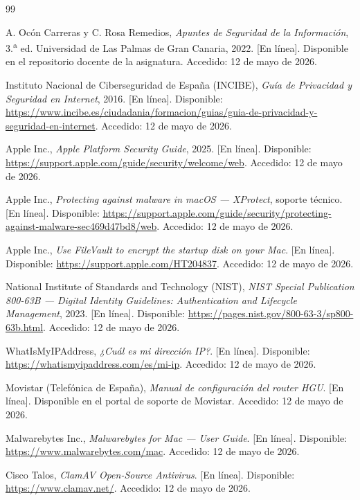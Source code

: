 \begin{thebibliography}{99}

A. Ocón Carreras y C. Rosa Remedios, \emph{Apuntes de Seguridad de la Información}, 3.\textsuperscript{a} ed. Universidad de Las Palmas de Gran Canaria, 2022. [En línea]. Disponible en el repositorio docente de la asignatura. Accedido: 12 de mayo de 2026.

Instituto Nacional de Ciberseguridad de España (INCIBE), \emph{Guía de Privacidad y Seguridad en Internet}, 2016. [En línea]. Disponible: \url{https://www.incibe.es/ciudadania/formacion/guias/guia-de-privacidad-y-seguridad-en-internet}. Accedido: 12 de mayo de 2026.

Apple Inc., \emph{Apple Platform Security Guide}, 2025. [En línea]. Disponible: \url{https://support.apple.com/guide/security/welcome/web}. Accedido: 12 de mayo de 2026.

Apple Inc., \emph{Protecting against malware in macOS --- XProtect}, soporte técnico. [En línea]. Disponible: \url{https://support.apple.com/guide/security/protecting-against-malware-sec469d47bd8/web}. Accedido: 12 de mayo de 2026.

Apple Inc., \emph{Use FileVault to encrypt the startup disk on your Mac}. [En línea]. Disponible: \url{https://support.apple.com/HT204837}. Accedido: 12 de mayo de 2026.

National Institute of Standards and Technology (NIST), \emph{NIST Special Publication 800-63B --- Digital Identity Guidelines: Authentication and Lifecycle Management}, 2023. [En línea]. Disponible: \url{https://pages.nist.gov/800-63-3/sp800-63b.html}. Accedido: 12 de mayo de 2026.

WhatIsMyIPAddress, \emph{¿Cuál es mi dirección IP?}. [En línea]. Disponible: \url{https://whatismyipaddress.com/es/mi-ip}. Accedido: 12 de mayo de 2026.

Movistar (Telefónica de España), \emph{Manual de configuración del router HGU}. [En línea]. Disponible en el portal de soporte de Movistar. Accedido: 12 de mayo de 2026.

Malwarebytes Inc., \emph{Malwarebytes for Mac --- User Guide}. [En línea]. Disponible: \url{https://www.malwarebytes.com/mac}. Accedido: 12 de mayo de 2026.

Cisco Talos, \emph{ClamAV Open-Source Antivirus}. [En línea]. Disponible: \url{https://www.clamav.net/}. Accedido: 12 de mayo de 2026.

\end{thebibliography}
